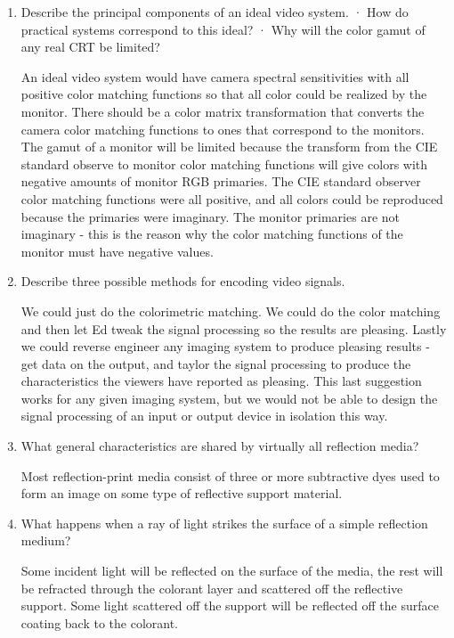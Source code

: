 \documentclass{amsart}
\theoremstyle{definition}
\theoremstyle{remark}
\numberwithin{equation}{section}
\begin{document}
\begin{enumerate}
\item Describe the principal components of an ideal video system.
 · How do practical systems correspond to this ideal?
 · Why will the color gamut of any real CRT be limited?
\newline
\par An ideal video system would have camera spectral
sensitivities with all positive color matching functions so that
all color could be realized by the monitor.  There should be a
color matrix transformation that converts the camera color
matching functions to ones that correspond to the monitors.  The
gamut of a monitor will be limited because the transform from the
CIE standard observe to monitor color matching functions will give
colors with negative amounts of monitor RGB primaries.  The CIE
standard observer color matching functions were all positive, and
all colors could be reproduced because the primaries were
imaginary.  The monitor primaries are not imaginary - this is the
reason why the color matching functions of the monitor must have
negative values.
\newline

\item Describe three possible methods for encoding video signals.
\newline
\par We could just do the colorimetric matching.  We could do the
color matching and then let Ed tweak the signal processing so the
results are pleasing.  Lastly we could reverse engineer any
imaging system to produce pleasing results - get data on the
output, and taylor the signal processing to produce the
characteristics the viewers have reported as pleasing.  This last
suggestion works for any given imaging system, but we would not be
able to design the signal processing of an input or output device
in isolation this way.

\item  What general characteristics are shared by virtually all
reflection media?
\newline
\par  Most reflection-print media consist of three or more
subtractive dyes used to form an image on some type of reflective
support material.
\newline
\item  What happens when a ray of light strikes the surface of a
simple reflection medium?
\newline
\par Some incident light will be reflected on the surface of the media,
the rest will be refracted through the colorant layer and
scattered off the reflective support. Some light scattered off the
support will be reflected off the surface coating back to the
colorant. 
\newline


\end{enumerate}
\end{document}
